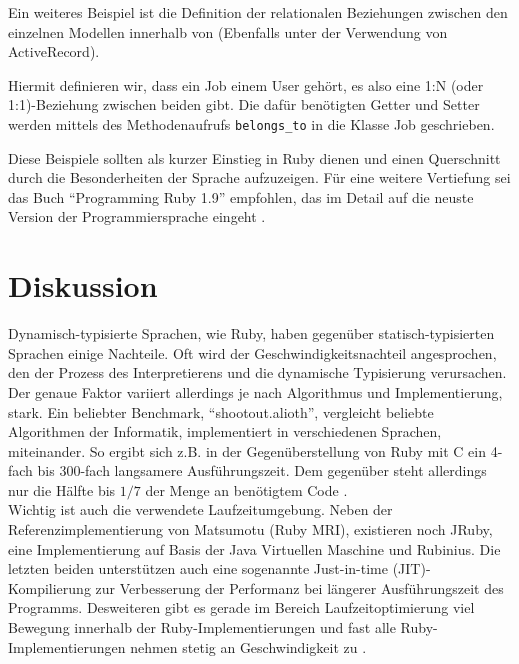 Ein weiteres Beispiel ist die Definition der relationalen Beziehungen zwischen den einzelnen Modellen innerhalb von  (Ebenfalls unter der Verwendung von ActiveRecord).
\begin{ruby}[label=app/models/job.rb]
   
   
\end{ruby}

Hiermit definieren wir, dass ein Job einem User gehört, es also eine 1:N (oder 1:1)-Beziehung zwischen beiden gibt. Die dafür benötigten Getter und Setter werden mittels des Methodenaufrufs \texttt{belongs\_to} in die Klasse Job geschrieben.

Diese Beispiele sollten als kurzer Einstieg in Ruby dienen und einen Querschnitt durch die Besonderheiten der Sprache aufzuzeigen.
Für eine weitere Vertiefung sei das Buch "`Programming Ruby 1.9"' empfohlen, das im Detail auf die neuste Version der Programmiersprache eingeht \citep{hunt_programming_2009}.



\section{Diskussion}

Dynamisch-typisierte Sprachen, wie Ruby, haben gegenüber statisch-typisierten Sprachen einige Nachteile. Oft wird der Geschwindigkeitsnachteil angesprochen, den der Prozess des Interpretierens und die dynamische Typisierung verursachen. 
Der genaue Faktor variiert allerdings je nach Algorithmus und Implementierung, stark. Ein beliebter Benchmark, "`shootout.alioth"', vergleicht beliebte Algorithmen der Informatik, implementiert in verschiedenen Sprachen, miteinander. So ergibt sich z.B. in der Gegenüberstellung von Ruby mit C ein 4-fach bis 300-fach langsamere Ausführungszeit. Dem gegenüber steht allerdings nur die Hälfte bis $1/7$ der Menge an benötigtem Code \citep{computer_language_benchmarks_game_ruby_2011}. \\
Wichtig ist auch die verwendete Laufzeitumgebung. Neben der Referenzimplementierung von Matsumotu (Ruby MRI), existieren noch JRuby, eine Implementierung auf Basis der Java Virtuellen Maschine und Rubinius. Die letzten beiden unterstützen auch eine sogenannte Just-in-time (JIT)-Kompilierung zur Verbesserung der Performanz bei längerer Ausführungszeit des Programms. Desweiteren gibt es gerade im Bereich Laufzeitoptimierung viel Bewegung innerhalb der Ruby-Implementierungen und fast alle Ruby-Implementierungen nehmen stetig an Geschwindigkeit zu \citep{antonio_cangiano_great_2010}.


